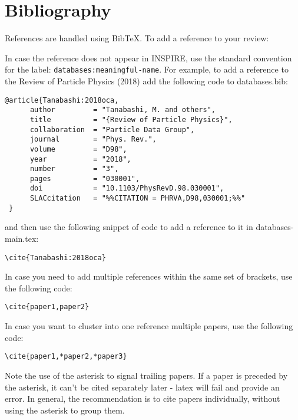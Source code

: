 \section{Bibliography}

References are handled using BibTeX. To add a reference to your review:
In case the reference does not appear in INSPIRE, use the standard convention for the label: {\tt databases:meaningful-name}.
For example, to add a reference to the Review of Particle Physics (2018) 
add the following code to databases.bib:
\begin{verbatim}
@article{Tanabashi:2018oca,
      author         = "Tanabashi, M. and others",
      title          = "{Review of Particle Physics}",
      collaboration  = "Particle Data Group",
      journal        = "Phys. Rev.",
      volume         = "D98",
      year           = "2018",
      number         = "3",
      pages          = "030001",
      doi            = "10.1103/PhysRevD.98.030001",
      SLACcitation   = "%%CITATION = PHRVA,D98,030001;%%"
 }
\end{verbatim}
and then use the following snippet of code to add a reference to it in databases-main.tex:
\begin{verbatim}
\cite{Tanabashi:2018oca}
\end{verbatim}
In case you need to add multiple references within the same set of brackets, use the following code:
\begin{verbatim}
\cite{paper1,paper2}
\end{verbatim}
In case you want to cluster into one reference multiple papers, use the following code:
\begin{verbatim}
\cite{paper1,*paper2,*paper3}
\end{verbatim}
Note the use of the asterisk to signal trailing papers. 
If a paper is preceded by the asterisk, it can't be cited separately later - latex will fail and provide an error.
In general, the recommendation is to cite papers individually, without using the asterisk to group them.


